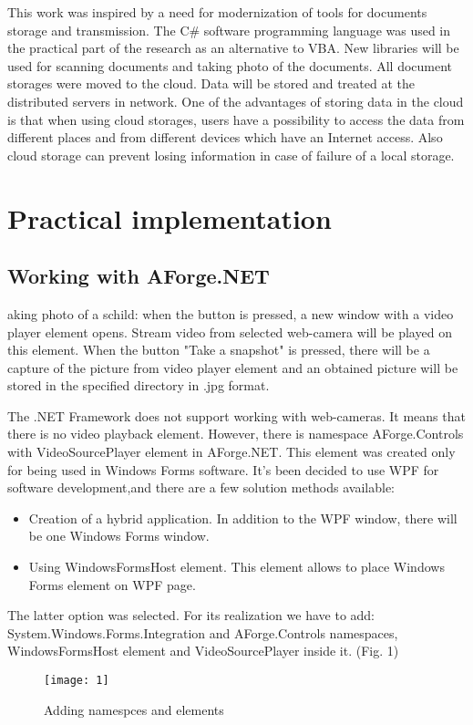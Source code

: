 \documentclass[12pt,journal,compsoc]{D:/Магистратура/English/bare_conf/IEEEtran}
\begin{document}
This work was inspired by a need for modernization of tools for documents storage and transmission. The C\# software programming language was used in the practical part of the research  as an alternative to VBA. New libraries will be used for scanning documents and taking photo of the documents. All document storages were moved to the cloud. Data will be stored and treated at the distributed servers in network. One of the advantages of storing data in the cloud is that when using cloud storages, users have a possibility to access the data from different places and from different devices which have an Internet access. Also cloud storage can prevent losing information in case of failure of a local storage.

\section{Practical implementation}
\subsection{Working with AForge.NET}
aking photo of a schild: when the button is pressed, a new window with a video player element  opens. Stream video from selected web-camera will be played on this element. When the button "Take a snapshot" is pressed, there will be a capture of the picture from video player element and an obtained picture will be stored in the specified directory in .jpg format.

The .NET Framework does not support working with web-cameras. It means that there is no video playback element. However, there is namespace AForge.Controls with VideoSourcePlayer element in AForge.NET. This element was created only for being used in Windows Forms software. It’s been decided to use WPF for software development,and there are a few solution methods available:
\begin{itemize}
\item Creation of a hybrid application. In addition to the WPF window, there will be one Windows Forms window.
\item Using WindowsFormsHost element. This element allows to place Windows Forms element on WPF page.
\end{itemize}

The latter option  was selected. For its realization we have to add: System.Windows.Forms.Integration and AForge.Controls namespaces, WindowsFormsHost element and VideoSourcePlayer inside it. (Fig. 1)
\begin{figure}[h]
\centering
\texttt{[image: 1]}
\centering
\caption{Adding namespces and elements}
\end{figure}
\end{document}
